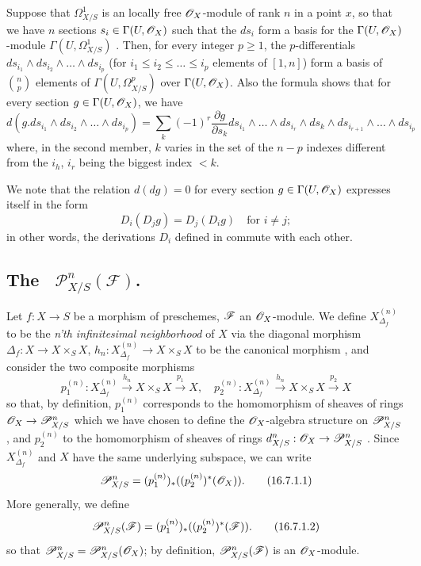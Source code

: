 \begin{env}[16.6.5]
\label{IV.16.6.5}
Suppose that $\Omega_{X/S}^1$ is an locally free $\mathscr{O}_X$-module of rank $n$ in a point $x$, so that we have $n$ sections $s_i \in \Gamma(U, \mathscr{O}_X)$ such that the $ds_i$ form a basis for the $\Gamma(U, \mathscr{O}_X)$-module $\Gamma(U, \Omega_{X/S}^1)$ .
Then, for every integer $p \geq 1$, the $p$-differentials $ds_{i_1} \wedge ds_{i_2} \wedge \dots \wedge ds_{i_p}$ (for $i_1 \leq i_2 \leq \dots \leq i_p$ elements of $[1,n]$) form a basis of $\binom{n}{p}$ elements of $\Gamma(U, \Omega_{X/S}^p)$ over $\Gamma(U, \mathscr{O}_X)$.
Also the formula  shows that for every section $g \in \Gamma(U, \mathscr{O}_X)$, we have
\[
  \label{IV.16.6.5.1}
  d(g.ds_{i_1} \wedge ds_{i_2} \wedge \dots \wedge ds_{i_p}) = \sum_k (-1)^r \frac{\partial g}{\partial s_k} ds_{i_1} \wedge \dots \wedge ds_{i_r} \wedge ds_k \wedge ds_{i_{r+1}} \wedge \dots \wedge ds_{i_p}
  \tag{16.6.5.1}
\]
where, in the second member, $k$ varies in the set of the $n - p$ indexes different from the $i_h$, $i_r$ being the biggest index $<k$.

We note that the relation $d(dg) = 0$ for every section $g \in \Gamma(U, \mathscr{O}_X)$ expresses itself in the form
\[
  D_i(D_j g) = D_j(D_i g) \quad \text{for $i \neq j$};
\]
in other words, the derivations $D_i$ defined in  commute with each other.
\end{env}

\subsection{The ~$\mathcal{P}_{X/S}^n(\mathcal{F})$.}
\label{IV.16.7}

\begin{env}[16.7.1]
\label{IV.16.7.1}
Let $f:X \to S$ be a morphism of preschemes, $\mathscr{F}$ an $\mathscr{O}_X$-module.
We define $X_{\Delta_f}^{(n)}$ to be the \emph{n'th infinitesimal neighborhood} of $X$ via the diagonal morphism
$\Delta_f: X \to X \times_S X$, $h_n:X_{\Delta_f}^{(n)} \to X \times_S X$ to be the canonical morphism , and consider the two composite morphisms
\[
  p_1^{(n)}:X_{\Delta_f}^{(n)} \xrightarrow{h_n} X \times_S X \xrightarrow{p_1} X, \quad 
  p_2^{(n)}:X_{\Delta_f}^{(n)} \xrightarrow{h_n} X \times_S X \xrightarrow{p_2} X
\]
so that, by definition, $p_1^{(n)}$ corresponds to the homomorphism of sheaves of rings $\sh{O}_X \to \sh{P}_{X/S}^n$ which we have chosen to define the $\mathscr{O}_X$-algebra structure on $\mathscr{P}_{X/S}^n$ , and $p_2^{(n)}$ to the homomorphism of sheaves of rings $d^n_{X/S}:\sh{O}_X \to \sh{P}_{X/S}^n$ .
Since $X_{\Delta_f}^{(n)}$ and $X$ have the same underlying subspace, we can write
\[
  \label{IV.16.7.1.1}
  \mathscr{P}_{X/S}^n = (p_1^{(n)})_* ((p_2^{(n)})^* (\mathscr{O}_X)).
  \tag{16.7.1.1}
\]
More generally, we define
\[
  \label{IV.16.7.1.2}
  \mathscr{P}_{X/S}^n(\mathscr{F}) = (p_1^{(n)})_* ((p_2^{(n)})^* (\mathscr{F})).
  \tag{16.7.1.2}
\]
so that $\mathscr{P}_{X/S}^n = \mathscr{P}_{X/S}^n(\mathscr{O}_X)$;
by definition, $\mathscr{P}_{X/S}^n(\mathscr{F})$ is an $\mathscr{O}_X$-module.
\end{env}


